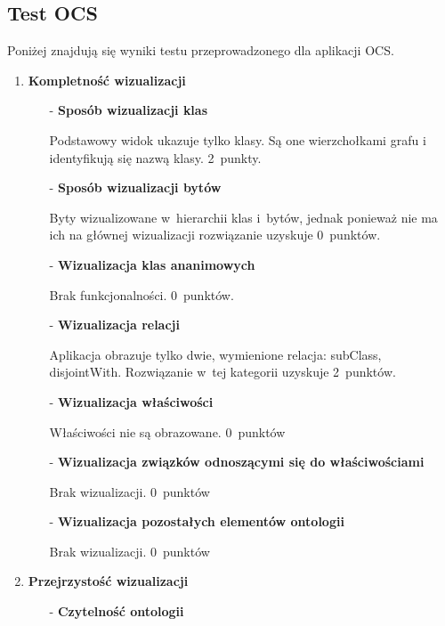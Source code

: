\subsection*{Test OCS}

Poniżej znajdują się wyniki testu przeprowadzonego dla aplikacji OCS. 

\begin{enumerate}
 \item{\bf Kompletność wizualizacji}

  \begin{itemize}
   \item[-]{\bf Sposób wizualizacji klas}

  \nopagebreak  
Podstawowy widok ukazuje tylko klasy. Są one wierzchołkami grafu i identyfikują się nazwą klasy. 2~punkty.

   \item[-]{\bf Sposób wizualizacji bytów}

  \nopagebreak 
Byty wizualizowane w~hierarchii klas i~bytów, jednak ponieważ nie ma ich na głównej wizualizacji rozwiązanie uzyskuje 0~punktów.


   \item[-]{\bf Wizualizacja klas ananimowych}

  \nopagebreak 
Brak funkcjonalności. 0~punktów.


   \item[-]{\bf Wizualizacja relacji}

  \nopagebreak 
Aplikacja obrazuje tylko dwie, wymienione relacja:  subClass,  disjointWith. Rozwiązanie w~tej kategorii uzyskuje 2~punktów.

 \item[-]{\bf Wizualizacja właściwości} 

  \nopagebreak
Właściwości nie są obrazowane. 0~punktów

 \item[-]{\bf Wizualizacja związków odnoszącymi się do właściwościami} 

  \nopagebreak
Brak wizualizacji. 0~punktów
 \item[-]{\bf Wizualizacja pozostałych elementów ontologii} 

  \nopagebreak
Brak wizualizacji. 0~punktów
  \end{itemize}

\item{\bf Przejrzystość wizualizacji}
\begin{itemize}
 \item[-]{\bf Czytelność ontologii} 


\end{itemize}
\end{enumerate}
